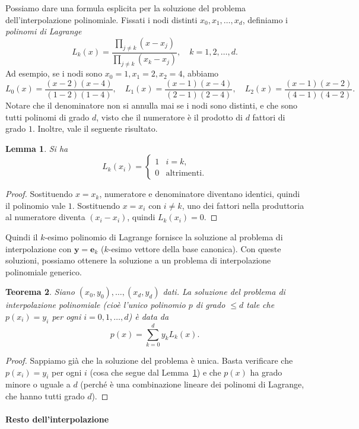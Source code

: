 \documentclass[a4paper]{report}
\newtheorem{theorem}{Teorema}[chapter]
\newtheorem{lemma}[theorem]{Lemma}
\theoremstyle{definiton}
\theoremstyle{remark}
\newcommand{\e}{\mathbf{e}}
\begin{document}
Possiamo dare una formula esplicita per la soluzione del problema dell'interpolazione polinomiale. Fissati i nodi distinti $x_0,x_1,\dots,x_d$, definiamo i \emph{polinomi di Lagrange}
\[
L_k(x) = \frac{\prod_{j\neq k}(x - x_j)}{\prod_{j\neq k}(x_k - x_j)}, \quad k=1,2,\dots,d.
\]
Ad esempio, se i nodi sono $x_0 = 1, x_1 = 2, x_2 = 4$, abbiamo
\[
L_0(x) = \frac{(x-2)(x-4)}{(1-2)(1-4)}, \quad L_1(x) = \frac{(x-1)(x-4)}{(2-1)(2-4)}, \quad L_2(x) = \frac{(x-1)(x-2)}{(4-1)(4-2)}.
\]
Notare che il denominatore non si annulla mai se i nodi sono distinti, e che sono tutti polinomi di grado $d$, visto che il numeratore è il prodotto di $d$ fattori di grado $1$. Inoltre, vale il seguente risultato.
\begin{lemma} \label{lem:polylagrange}
Si ha
\[
L_k(x_i) = \begin{cases}
1 & i=k,\\
0 & \text{altrimenti}.
\end{cases}
\]
\end{lemma}
\begin{proof}
Sostituendo $x = x_k$, numeratore e denominatore diventano identici, quindi il polinomio vale $1$. Sostituendo $x = x_i$ con $i\neq k$, uno dei fattori nella produttoria al numeratore diventa $(x_i-x_i)$, quindi $L_k(x_i) = 0$.
\end{proof}
Quindi il $k$-esimo polinomio di Lagrange fornisce la soluzione al problema di interpolazione con $\mathbf{y} = \e_k$ ($k$-esimo vettore della base canonica). Con queste soluzioni, possiamo ottenere la soluzione a un problema di interpolazione polinomiale generico.
\begin{theorem}
Siano $(x_0,y_0),\dots,(x_d,y_d)$ dati. La soluzione del problema di interpolazione polinomiale (cioè l'unico polinomio $p$ di grado $\leq d$ tale che $p(x_i)=y_i$ per ogni $i=0,1,\dots,d$) è data da
\[
p(x) = \sum_{k=0}^d y_k L_k(x).
\]
\end{theorem}
\begin{proof}
Sappiamo già che la soluzione del problema è unica. Basta verificare che $p(x_i) = y_i$ per ogni $i$ (cosa che segue dal Lemma~\ref{lem:polylagrange}) e che $p(x)$ ha grado minore o uguale a $d$ (perché è una combinazione lineare dei polinomi di Lagrange, che hanno tutti grado $d$). 
\end{proof}


\paragraph{Resto dell'interpolazione}
\end{document}

